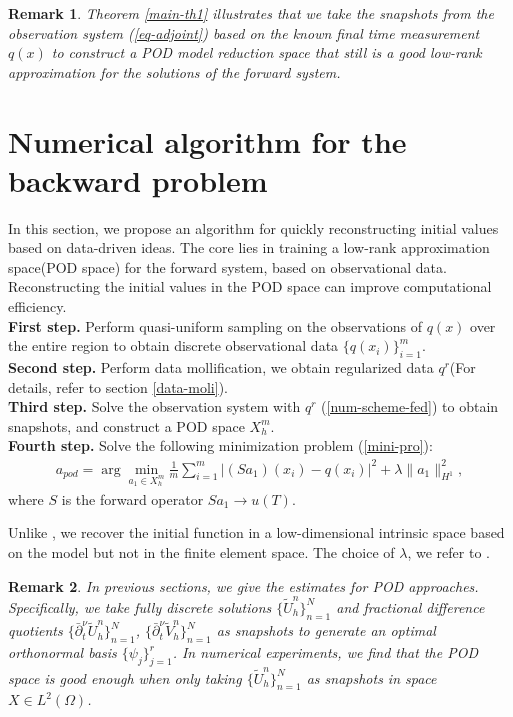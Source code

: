 \documentclass[11pt]{article}
\newtheorem{remark}{Remark}[section]
\numberwithin{equation}{section}
\begin{document}
\begin{remark}
Theorem \ref{main-th1} illustrates that we take the snapshots from the observation system (\ref{eq-adjoint}) based on the known final time measurement $q(x)$ to construct a POD model reduction space that still is a good low-rank approximation for the solutions of the forward system.
\end{remark}

\section{Numerical algorithm for the backward problem}\label{sec-num}
In this section, we propose an algorithm for quickly reconstructing initial values based on data-driven ideas. The core lies in training a low-rank approximation space(POD space) for the forward system,  based on observational data. Reconstructing the initial values in the POD space can improve computational efficiency.
\\
\textbf{ First step.} Perform quasi-uniform sampling on the observations of $q(x)$ over the entire region to obtain discrete observational data $\{q(x_i)\}_{i=1}^m$.\\ 
\textbf{ Second step.} Perform data mollification, we obtain regularized data $q^r$(For details, refer to section \ref{data-moli}). \\
\textbf{ Third step.} Solve the observation system with $q^r$ (\ref{num-scheme-fed}) to obtain snapshots, and construct a POD space $X_h^m$.\\
\textbf{ Fourth step.} Solve the following minimization problem (\ref{mini-pro}):
\begin{align}\label{mini-pro}
a_{pod}=\arg \min\limits_{a_1\in X_h^m}\frac{1}{m}\sum_{i=1}^m|(Sa_1)(x_i)-q(x_i)|^2+\lambda\|a_1\|_{H^1}^2,
\end{align}
where $S$ is the forward operator $Sa_1\rightarrow u(T)$.

Unlike \cite{LiZhang2025,LiZhang2024}, we recover the initial function in a low-dimensional intrinsic space based on the model but not in the finite element space. The choice of $\lambda$, we refer to \cite{LiZhang2025}.

\begin{remark}
In previous sections, we give the estimates for POD approaches. Specifically, we take fully discrete solutions $\{\widetilde{U}_h^n\}_{n=1}^N$ and fractional difference quotients $\{\bar\partial_t^\nu \widetilde{U}_h^n\}_{n=1}^N$, $\{\bar\partial_t^\nu \widetilde{V}_h^n\}_{n=1}^N$ as snapshots to generate an optimal orthonormal basis $\{\psi_j\}_{j=1}^r$.    
In numerical experiments, we find that the POD space is good enough when only taking $\{\widetilde{U}_h^n\}_{n=1}^N$ as snapshots in space $X\in L^2(\Omega)$.
\end{remark}
\end{document}
